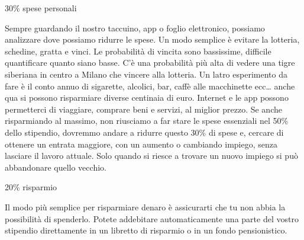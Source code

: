 \documentclass[12pt]{book} %
\begin{document}
\bigskip

30\% spese personali

Sempre guardando il nostro taccuino, app o foglio elettronico, possiamo analizzare dove possiamo ridurre le spese. Un
modo semplice è evitare la lotteria, schedine, gratta e vinci. Le probabilità di vincita sono bassissime, difficile
quantificare quanto siano basse. C'è una probabilità più alta di vedere una tigre siberiana in
centro a Milano che vincere alla lotteria. Un latro esperimento da fare è il conto annuo di sigarette, alcolici, bar,
caffè alle macchinette ecc… anche qua si possono risparmiare diverse centinaia di euro. Internet e le app possono
permetterci di viaggiare, comprare beni e servizi, al miglior prezzo. Se anche risparmiando al massimo, non riusciamo a
far stare le spese essenziali nel 50\% dello stipendio, dovremmo andare a ridurre questo 30\% di spese e, cercare di
ottenere un entrata maggiore, con un aumento o cambiando impiego, senza lasciare il lavoro attuale. Solo quando si
riesce a trovare un nuovo impiego si può abbandonare quello vecchio.


\bigskip

20\% risparmio

Il modo più semplice per risparmiare denaro è assicurarti che tu non abbia la possibilità di spenderlo. Potete
addebitare automaticamente una parte del vostro stipendio direttamente in un libretto di risparmio o in un fondo
pensionistico.
\end{document}
